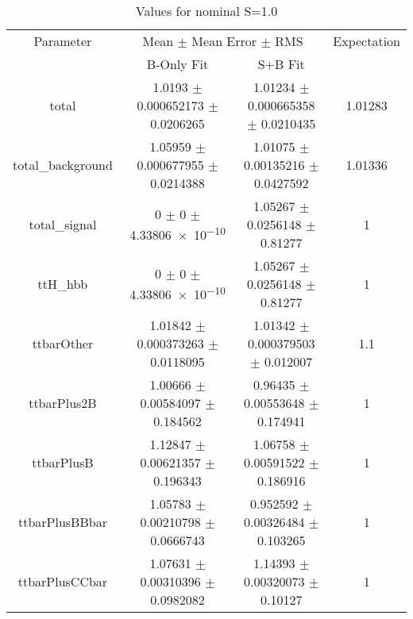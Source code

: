\begin{table}
\centering
\caption{Values for nominal S=1.0}
\begin{tabular}{cccc}
\toprule
Parameter & \multicolumn{2}{c}{Mean $\pm$ Mean Error $\pm$ RMS} & Expectation\\
 & B-Only Fit & S+B Fit & \\
\midrule
total & \num{1.0193} $\pm$ \num{0.000652173} $\pm$ \num{0.0206265} & \num{1.01234} $\pm$ \num{0.000665358} $\pm$ \num{0.0210435} & \num{1.01283}\\
total\_background & \num{1.05959} $\pm$ \num{0.000677955} $\pm$ \num{0.0214388} & \num{1.01075} $\pm$ \num{0.00135216} $\pm$ \num{0.0427592} & \num{1.01336}\\
total\_signal & \num{0} $\pm$ \num{0} $\pm$ \num{4.33806e-10} & \num{1.05267} $\pm$ \num{0.0256148} $\pm$ \num{0.81277} & \num{1}\\
ttH\_hbb & \num{0} $\pm$ \num{0} $\pm$ \num{4.33806e-10} & \num{1.05267} $\pm$ \num{0.0256148} $\pm$ \num{0.81277} & \num{1}\\
ttbarOther & \num{1.01842} $\pm$ \num{0.000373263} $\pm$ \num{0.0118095} & \num{1.01342} $\pm$ \num{0.000379503} $\pm$ \num{0.012007} & \num{1.1}\\
ttbarPlus2B & \num{1.00666} $\pm$ \num{0.00584097} $\pm$ \num{0.184562} & \num{0.96435} $\pm$ \num{0.00553648} $\pm$ \num{0.174941} & \num{1}\\
ttbarPlusB & \num{1.12847} $\pm$ \num{0.00621357} $\pm$ \num{0.196343} & \num{1.06758} $\pm$ \num{0.00591522} $\pm$ \num{0.186916} & \num{1}\\
ttbarPlusBBbar & \num{1.05783} $\pm$ \num{0.00210798} $\pm$ \num{0.0666743} & \num{0.952592} $\pm$ \num{0.00326484} $\pm$ \num{0.103265} & \num{1}\\
ttbarPlusCCbar & \num{1.07631} $\pm$ \num{0.00310396} $\pm$ \num{0.0982082} & \num{1.14393} $\pm$ \num{0.00320073} $\pm$ \num{0.10127} & \num{1}\\
\bottomrule
\end{tabular}
\end{table}